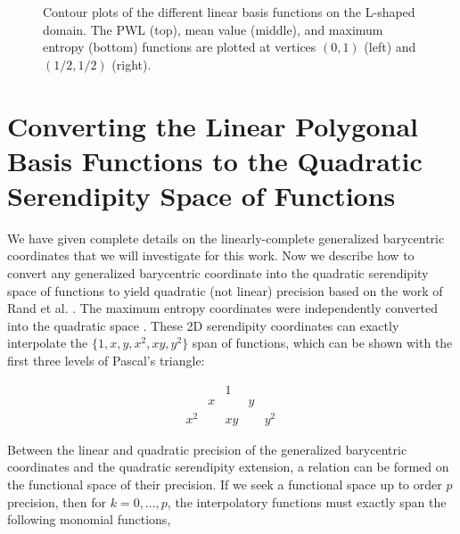 \begin{figure}
{\begin{subfigure}[b]{0.375\textwidth}
	\end{subfigure}
}
\vspace{2mm}
\caption{Contour plots of the different linear basis functions on the L-shaped domain. The PWL (top), mean value (middle), and maximum entropy (bottom) functions are plotted at vertices $(0,1)$ (left) and $(1/2,1/2)$ (right).}
\label{fig::2DSummary_Ldom_basis_functions}
\end{figure}

\section{Converting the Linear Polygonal Basis Functions to the Quadratic Serendipity Space of Functions}
\label{sec::BF_2DQuadratic}

We have given complete details on the linearly-complete generalized barycentric coordinates that we will investigate for this work. Now we describe how to convert any generalized barycentric coordinate into the quadratic serendipity space of functions to yield quadratic (not linear) precision based on the work of Rand et al. \cite{rand2014quadratic}. The maximum entropy coordinates were independently converted into the quadratic space \cite{gonzalez2010higher,sukumar2013quadratic}. These 2D serendipity coordinates can exactly interpolate the $\{ 1, x, y, x^2, xy, y^2 \}$ span of functions, which can be shown with the first three levels of Pascal's triangle:

\begin{equation}
\label{eq::BF_quad_pascal}
\begin{array}{ccccc}
 & & 1 & & \\
 & x & & y & \\
 x^2 &  &xy & & y^2 
\end{array} \, 
\end{equation}

\noindent Between the linear and quadratic precision of the generalized barycentric coordinates and the quadratic serendipity extension, a relation can be formed on the functional space of their precision. If we seek a functional space up to order $p$ precision, then for $k=0,...,p$, the interpolatory functions must exactly span the following monomial functions,

